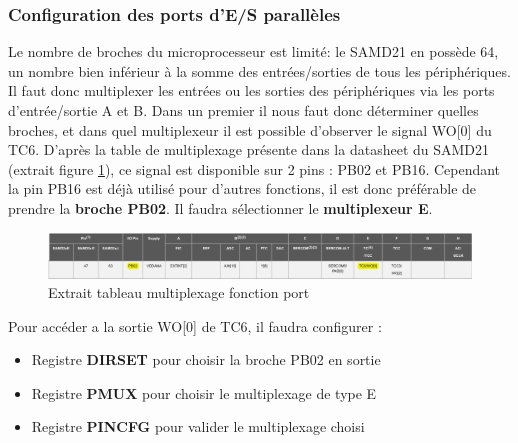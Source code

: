 \documentclass[a4paper]{article}
\begin{document}
	\subsubsection{Configuration des ports d'E/S parallèles} 
	Le nombre de broches du microprocesseur est limité: le SAMD21 en possède 64, un nombre bien inférieur à la somme des entrées/sorties de tous les périphériques. Il faut donc multiplexer les entrées ou les sorties des périphériques via les ports d’entrée/sortie A et B. Dans un premier il nous faut donc déterminer quelles broches, et dans quel multiplexeur il est possible d’observer le signal WO[0] du TC6. D’après la table de multiplexage présente dans la datasheet du SAMD21 (extrait figure \ref{fig:MUX_io}), ce signal est disponible sur 2 pins : PB02 et PB16. Cependant la pin PB16 est déjà utilisé pour d’autres fonctions, il est donc préférable de prendre la \textbf{broche PB02}. Il faudra sélectionner le \textbf{multiplexeur E}.
	\begin{figure}[H]
		\centering
		\includegraphics[width=\linewidth]{MUX_io}
		\caption{Extrait tableau multiplexage fonction port}
		\label{fig:MUX_io}
	\end{figure}
    Pour accéder a la sortie WO[0] de TC6, il faudra configurer :
    \begin{itemize}
		\item {Registre \bf DIRSET} pour choisir la broche PB02 en sortie
		\item {Registre \bf PMUX} pour choisir le multiplexage de type E
		\item {Registre \bf PINCFG} pour valider le multiplexage choisi
	\end{itemize}
	
\end{document}
